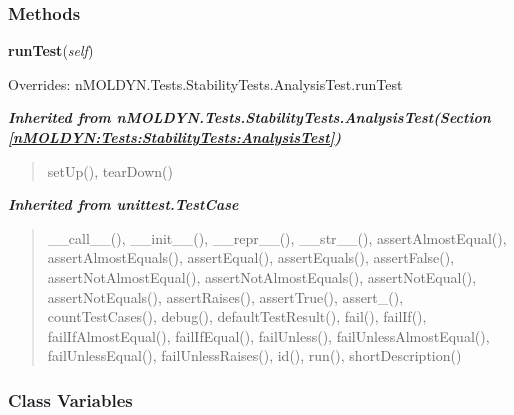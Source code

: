   \subsubsection{Methods}

    \vspace{0.5ex}

\hspace{.8\funcindent}\begin{boxedminipage}{\funcwidth}

    \raggedright \textbf{runTest}(\textit{self})

\setlength{\parskip}{2ex}
\setlength{\parskip}{1ex}
      Overrides: nMOLDYN.Tests.StabilityTests.AnalysisTest.runTest

    \end{boxedminipage}


\large{\textbf{\textit{Inherited from nMOLDYN.Tests.StabilityTests.AnalysisTest\textit{(Section \ref{nMOLDYN:Tests:StabilityTests:AnalysisTest})}}}}

\begin{quote}
setUp(), tearDown()
\end{quote}

\large{\textbf{\textit{Inherited from unittest.TestCase}}}

\begin{quote}
\_\_call\_\_(), \_\_init\_\_(), \_\_repr\_\_(), \_\_str\_\_(), assertAlmostEqual(), assertAlmostEquals(), assertEqual(), assertEquals(), assertFalse(), assertNotAlmostEqual(), assertNotAlmostEquals(), assertNotEqual(), assertNotEquals(), assertRaises(), assertTrue(), assert\_(), countTestCases(), debug(), defaultTestResult(), fail(), failIf(), failIfAlmostEqual(), failIfEqual(), failUnless(), failUnlessAlmostEqual(), failUnlessEqual(), failUnlessRaises(), id(), run(), shortDescription()
\end{quote}


  \subsubsection{Class Variables}

